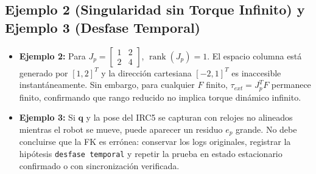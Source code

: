 \documentclass[10pt, a4paper]{article}
\begin{document}
\subsection{Ejemplo 2 (Singularidad sin Torque Infinito) y Ejemplo 3 (Desfase Temporal)}
\begin{itemize}[leftmargin=*, itemsep=2pt]
    \item \textbf{Ejemplo 2:} Para $J_p = \begin{bmatrix} 1 & 2 \\ 2 & 4 \end{bmatrix}$, $\operatorname{rank}(J_p) = 1$. El espacio columna está generado por $[1,2]^T$ y la dirección cartesiana $[-2,1]^T$ es inaccesible instantáneamente. Sin embargo, para cualquier $F$ finito, $\tau_{ext} = J_p^T F$ permanece finito, confirmando que rango reducido no implica torque dinámico infinito.
    \item \textbf{Ejemplo 3:} Si $\mathbf{q}$ y la pose del IRC5 se capturan con relojes no alineados mientras el robot se mueve, puede aparecer un residuo $e_p$ grande. No debe concluirse que la FK es errónea: conservar los logs originales, registrar la hipótesis \texttt{desfase temporal} y repetir la prueba en estado estacionario confirmado o con sincronización verificada.
\end{itemize}
\end{document}
